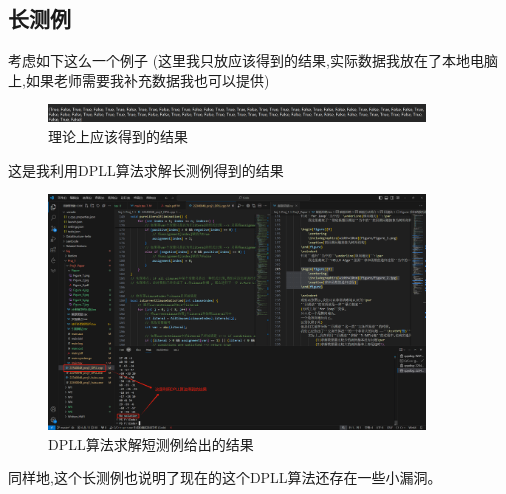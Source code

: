     \subsection{长测例}
    \par
    考虑如下这么一个例子
    (这里我只放应该得到的结果,实际数据我放在了本地电脑上,如果老师需要我补充数据我也可以提供)
    \begin{figure}[H]
        \centering
        \includegraphics[width=10cm]{Figure/Figure_7.jpg}
        \caption{理论上应该得到的结果}
    \end{figure}
    \par
    这是我利用DPLL算法求解长测例得到的结果
    \begin{figure}[H]
        \centering
        \includegraphics[width=10cm]{Figure/Figure_8.jpg}
        \caption{DPLL算法求解短测例给出的结果}
    \end{figure}
    \par
    同样地,这个长测例也说明了现在的这个DPLL算法还存在一些小漏洞。

